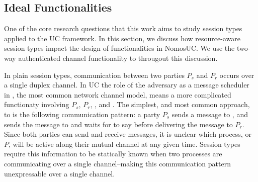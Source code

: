 
\subsection{Ideal Functionalities}
One of the core research questions that this work aims to study session types applied to the UC framework. 
In this section, we discuss how resource-aware session types impact the design of functionalities in NomosUC.
We use the two-way authenticated channel functionality \Fauth to througout this discussion.

In plain session types, communication between two parties $P_s$ and $P_r$ occurs over a single duplex channel.
In UC the role of the adversary as a message scheduler in \Fauth, the most common network channel model, means a more complicated functionaty involving $P_s$, $P_r$, \F, and \A. 
The simplest, and most common approach, to \Fauth is the following communication pattern: a party $P_s$ sends a message to \Fauth, and \Fauth sends the message to \A and waits for \A to say  before delivering the message to $P_r$.
Since both parties can send and receive messages, it is unclear which process, \Fauth or $P$, will be active along their mutual channel at any given time.
Session types require this information to be statically known when two processes are communicating over a single channel--making this communication pattern unexpressable over a single channel.

